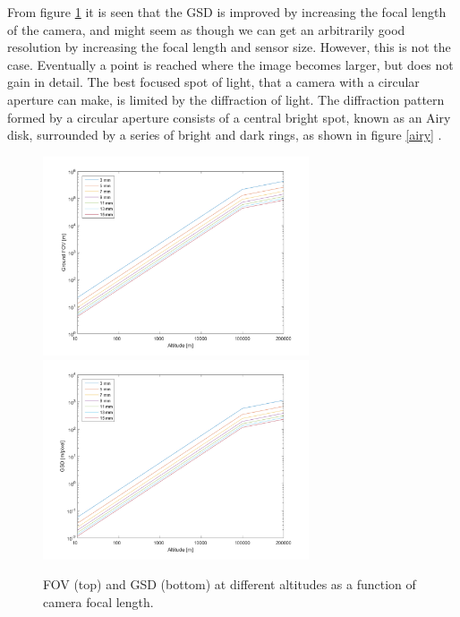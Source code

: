 From figure \ref{cameramatlab} it is seen that the GSD is improved by increasing the focal length of the camera, and might seem as though we can get an arbitrarily good resolution by increasing the focal length and sensor size. However, this is not the case. Eventually a point is reached where the image becomes larger, but does not gain in detail. The best focused spot of light, that a camera with a circular aperture can make, is limited by the diffraction of light. The diffraction pattern formed by a circular aperture consists of a central bright spot, known as an Airy disk, surrounded by a series of bright and dark rings, as shown in figure \ref{airy} \cite{uniphys}.

\begin{figure}[htb]
\begin{center}
\includegraphics[width=0.7\textwidth]{figures/navtheory/FOV} 
\includegraphics[width=0.7\textwidth]{figures/navtheory/GSD}
\caption{FOV (top) and GSD (bottom) at different altitudes as a function of  camera focal length. }
\label{cameramatlab}
\end{center}
\end{figure}



